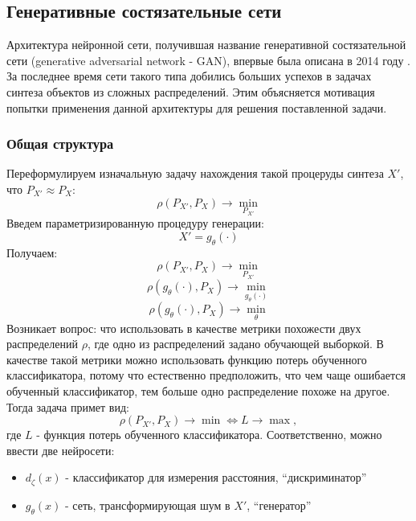 	\subsection{Генеративные состязательные сети}
		Архитектура нейронной сети, получившая название генеративной состязательной сети (generative adversarial network - GAN), впервые была описана в 2014 году \cite{GAN-original}. За последнее время сети такого типа добились больших успехов в задачах синтеза объектов из сложных распределений. Этим объясняется мотивация попытки применения данной архитектуры для решения поставленной задачи.
		\subsubsection{Общая структура}
			Переформулируем изначальную задачу нахождения такой процеруды синтеза $X'$, что $ P_{X'} \approx P_X$:
			$$ \rho(P_{X'}, P_X) \longrightarrow \underset{P_{X'}}{\min} $$
			Введем параметризированную процедуру генерации:
			$$ X' = g_{\theta}(\cdot) $$
			Получаем:
			$$ \rho(P_{X'}, P_X) \longrightarrow \underset{P_{X'}}{\min} $$
			$$ \rho(g_{\theta}(\cdot), P_X) \longrightarrow \underset{g_{\theta}(\cdot)}{\min} $$
			$$ \rho(g_{\theta}(\cdot), P_X) \longrightarrow \underset{\theta}{\min} $$
			Возникает вопрос: что использовать в качестве метрики похожести двух распределений $\rho$, где одно из распределений задано обучающей выборкой.
			В качестве такой метрики можно использовать функцию потерь обученного классификатора, потому что естественно предположить, что чем чаще ошибается обученный классификатор, тем больше одно распределение похоже на другое. Тогда задача примет вид:
			$$ \rho(P_{X'}, P_X) \longrightarrow \min \Leftrightarrow L \longrightarrow \max, $$
			где $L$ - функция потерь обученного классификатора.
			Соответственно, можно ввести две нейросети:
	
			\begin{itemize}
				\item $d_{\zeta}(x)$ - классификатор для измерения расстояния, ``дискриминатор''
				\item $g_{\theta}(x)$ - сеть, трансформирующая шум в $X'$, ``генератор''
			\end{itemize}
	
